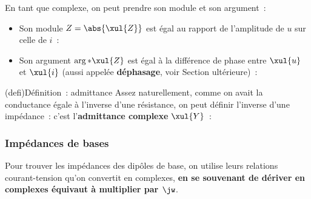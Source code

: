 \documentclass[../../main/main.tex]{subfiles}
\begin{document}
En tant que complexe, on peut prendre son module et son argument~:
\begin{itemize}
	\item Son module $Z = \abs{\xul{Z}}$ est égal au rapport de
	      l'amplitude de $u$ sur celle de $i$~:
	      \psw{
		      \[
			      \boxed{ \abs{\xul{Z}}
				      = \frac{\abs{\xul{u}|}{|\xul{i}}}
				      = \frac{U}{I}
			      }
		      \]
	      }
	\item Son argument $\arg*{\xul{Z}}$ est égal à la différence de phase entre
	      $\xul{u}$ et $\xul{i}$ (aussi appelée \textbf{déphasage}, voir Section
	      ultérieure)~:
	      \psw{
		      \[
			      \boxed{\arg*{\xul{Z}}
				      = \arg*{ \frac{\xul{u}}{\xul{i}} }
				      = \f_u - \f_i}
		      \]
	      }
\end{itemize}

\begin{tcb}(defi){Définition~: admittance}
	Assez naturellement, comme on avait la conductance égale à l'inverse d'une
	résistance, on peut définir l'inverse d'une impédance~: c'est
	l'\textbf{admittance complexe} $\xul{Y}$~:
	\psw{
		\[
			\boxed{\xul{Y}
				= \frac{1}{\xul{Z}} \Rightarrow \xul{I}
				= \xul{Y}\times\xul{U}}
		\]
	}
\end{tcb}

\subsubsection{Impédances de bases}

Pour trouver les impédances des dipôles de base, on utilise leurs relations
courant-tension qu'on convertit en complexes, \textbf{en se souvenant de dériver
	en complexes équivaut à multiplier par $\jw$}.
\end{document}
